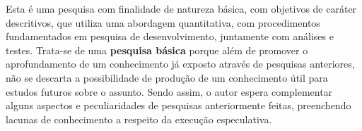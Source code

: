 \documentclass[
	article,			    %
	12pt,				    %
	oneside,			    %
	a4paper,			    %
	chapter=TITLE,		    %
	section=TITLE,		    %
	subsection=TITLE,	    %
	english,			    %
	brazil,				    %
	sumario=tradicional
]{abntex2}
\begin{document}
\begin{comment}
\subsection{Objetivos}
Em razão dos fatos supramencionados, esta pesquisa visa esclarecer, explicar e aplicar métodos desenvolvidos pelos autores citados anteriormente para expor informações de forma genérica (em \emph{softwares} comuns) em computadores pessoais. Assim, o \textbf{objetivo geral} desta pesquisa é demonstrar como a execução especulativa pode ocorrer em \emph{softwares} cujo o fluxo condicional e estrutura de memória se desconhece.

Para alcançar este \textbf{objetivo geral}, os seguintes \textbf{objetivos específicos} foram levantados: 
\begin{enumerate}
    \item \label{o1} Demonstrar e explorar a falha de execução especulativa em fluxos condicionais conhecidos;
    \item \label{o2} Demonstrar e explorar a falha de execução especulativa em fluxos condicionais desconhecidos;
    \item \label{o3} Demonstrar e explorar a falha de execução especulativa em regiões de memória cujos endereços não são conhecidos inicialmente.
\end{enumerate}
\end{comment}
Esta é uma pesquisa com finalidade de natureza básica, com objetivos de caráter descritivos, que utiliza uma abordagem quantitativa, com procedimentos fundamentados em pesquisa de desenvolvimento, juntamente com análises e testes. Trata-se de uma \textbf{pesquisa básica} porque além de promover o aprofundamento de um conhecimento já exposto através de pesquisas anteriores, não se descarta a possibilidade de produção de um conhecimento útil para estudos futuros sobre o assunto. Sendo assim, o autor espera complementar alguns aspectos e peculiaridades de pesquisas anteriormente feitas, preenchendo lacunas de conhecimento a respeito da execução especulativa.
\end{document}
